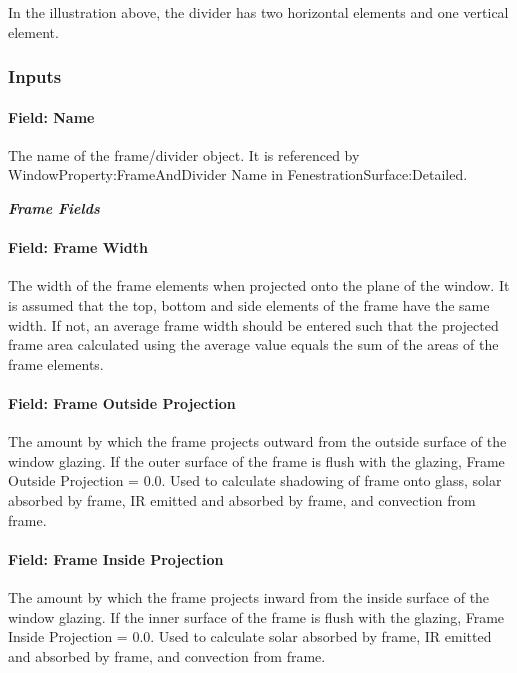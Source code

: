 In the illustration above, the divider has two horizontal elements and one vertical element.

\subsubsection{Inputs}\label{inputs-33-001}

\paragraph{Field: Name}\label{field-name-30-001}

The name of the frame/divider object. It is referenced by WindowProperty:FrameAndDivider Name in FenestrationSurface:Detailed.

\textbf{\emph{Frame Fields}}

\paragraph{Field: Frame Width}\label{field-frame-width}

The width of the frame elements when projected onto the plane of the window. It is assumed that the top, bottom and side elements of the frame have the same width. If not, an average frame width should be entered such that the projected frame area calculated using the average value equals the sum of the areas of the frame elements.

\paragraph{Field: Frame Outside Projection}\label{field-frame-outside-projection}

The amount by which the frame projects outward from the outside surface of the window glazing. If the outer surface of the frame is flush with the glazing, Frame Outside Projection = 0.0. Used to calculate shadowing of frame onto glass, solar absorbed by frame, IR emitted and absorbed by frame, and convection from frame.

\paragraph{Field: Frame Inside Projection}\label{field-frame-inside-projection}

The amount by which the frame projects inward from the inside surface of the window glazing. If the inner surface of the frame is flush with the glazing, Frame Inside Projection = 0.0. Used to calculate solar absorbed by frame, IR emitted and absorbed by frame, and convection from frame.

